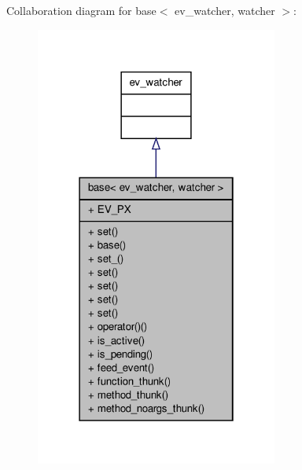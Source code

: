 \-Collaboration diagram for base$<$ ev\-\_\-watcher, watcher $>$\-:
\nopagebreak
\begin{figure}[H]
\begin{center}
\leavevmode
\includegraphics[width=226pt]{structev_1_1base__coll__graph}
\end{center}
\end{figure}
